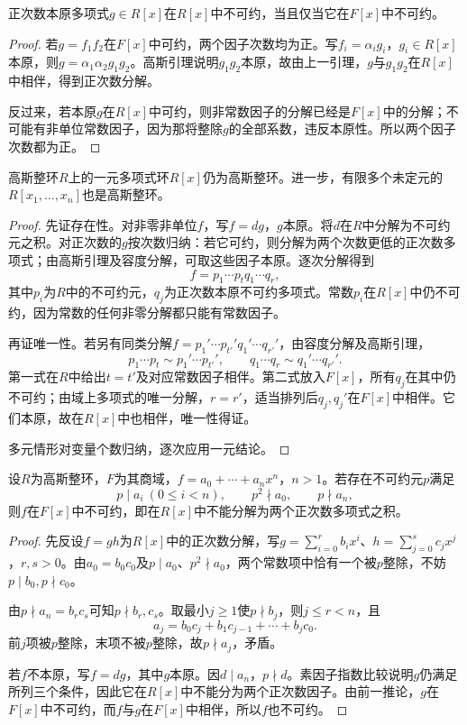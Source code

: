 \begin{corollary}
正次数本原多项式$g\in R[x]$在$R[x]$中不可约，当且仅当它在$F[x]$中不可约。
\end{corollary}
\begin{proof}
若$g=f_1f_2$在$F[x]$中可约，两个因子次数均为正。写$f_i=\alpha_i g_i$，$g_i\in R[x]$本原，则$g=\alpha_1\alpha_2g_1g_2$。高斯引理说明$g_1g_2$本原，故由上一引理，$g$与$g_1g_2$在$R[x]$中相伴，得到正次数分解。

反过来，若本原$g$在$R[x]$中可约，则非常数因子的分解已经是$F[x]$中的分解；不可能有非单位常数因子，因为那将整除$g$的全部系数，违反本原性。所以两个因子次数都为正。
\end{proof}

\begin{theorem}\label{p2:polynomial-ufd}
高斯整环$R$上的一元多项式环$R[x]$仍为高斯整环。进一步，有限多个未定元的$R[x_1,\ldots,x_n]$也是高斯整环。
\end{theorem}
\begin{proof}
先证存在性。对非零非单位$f$，写$f=dg$，$g$本原。将$d$在$R$中分解为不可约元之积。对正次数的$g$按次数归纳：若它可约，则分解为两个次数更低的正次数多项式；由高斯引理及容度分解，可取这些因子本原。逐次分解得到
\[
f=p_1\cdots p_tq_1\cdots q_r,
\]
其中$p_i$为$R$中的不可约元，$q_j$为正次数本原不可约多项式。常数$p_i$在$R[x]$中仍不可约，因为常数的任何非零分解都只能有常数因子。

再证唯一性。若另有同类分解$f=p_1'\cdots p_{t'}'q_1'\cdots q_{r'}'$，由容度分解及高斯引理，
\[
p_1\cdots p_t\sim p_1'\cdots p_{t'}',\qquad
q_1\cdots q_r\sim q_1'\cdots q_{r'}'.
\]
第一式在$R$中给出$t=t'$及对应常数因子相伴。第二式放入$F[x]$，所有$q_j$在其中仍不可约；由域上多项式的唯一分解，$r=r'$，适当排列后$q_j,q_j'$在$F[x]$中相伴。它们本原，故在$R[x]$中也相伴，唯一性得证。

多元情形对变量个数归纳，逐次应用一元结论。
\end{proof}

\begin{theorem}[艾森斯坦判别法]\label{p2:eisenstein}
设$R$为高斯整环，$F$为其商域，$f=a_0+\cdots+a_nx^n$，$n>1$。若存在不可约元$p$满足
\[
p\mid a_i\ (0\le i<n),\qquad p^2\nmid a_0,\qquad p\nmid a_n,
\]
则$f$在$F[x]$中不可约，即在$R[x]$中不能分解为两个正次数多项式之积。
\end{theorem}
\begin{proof}
先反设$f=gh$为$R[x]$中的正次数分解，写$g=\sum_{i=0}^rb_ix^i$、$h=\sum_{j=0}^sc_jx^j$，$r,s>0$。由$a_0=b_0c_0$及$p\mid a_0$、$p^2\nmid a_0$，两个常数项中恰有一个被$p$整除，不妨$p\mid b_0,p\nmid c_0$。

由$p\nmid a_n=b_rc_s$可知$p\nmid b_r,c_s$。取最小$j\ge1$使$p\nmid b_j$，则$j\le r<n$，且
\[
a_j=b_0c_j+b_1c_{j-1}+\cdots+b_jc_0.
\]
前$j$项被$p$整除，末项不被$p$整除，故$p\nmid a_j$，矛盾。

若$f$不本原，写$f=dg$，其中$g$本原。因$d\mid a_n$，$p\nmid d$。素因子指数比较说明$g$仍满足所列三个条件，因此它在$R[x]$中不能分为两个正次数因子。由前一推论，$g$在$F[x]$中不可约，而$f$与$g$在$F[x]$中相伴，所以$f$也不可约。
\end{proof}

